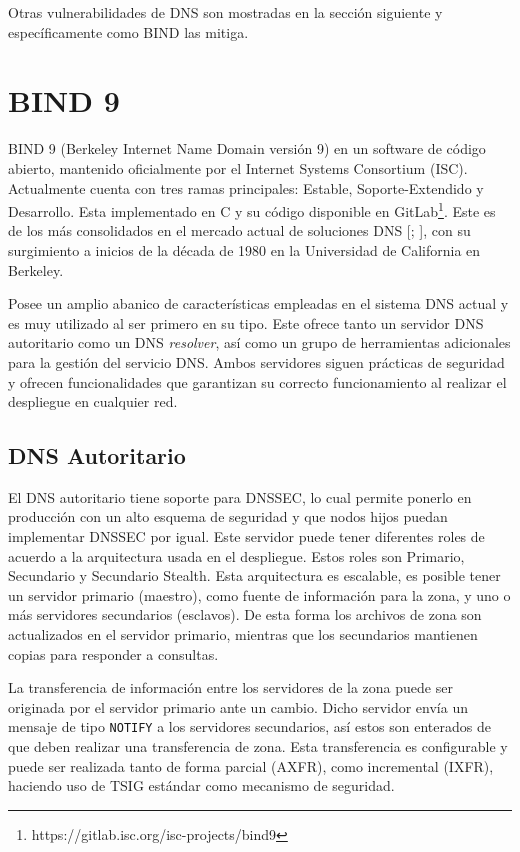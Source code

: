 Otras vulnerabilidades de DNS son mostradas en la sección siguiente y específicamente como BIND las mitiga.  

\section{BIND 9}

BIND 9 (Berkeley Internet Name Domain versión 9) en un software de código abierto, mantenido oficialmente por el Internet Systems Consortium (ISC). Actualmente cuenta con tres ramas principales: Estable, Soporte-Extendido y Desarrollo. Esta implementado en C y su código disponible en GitLab\footnote{https://gitlab.isc.org/isc-projects/bind9}. Este es de los más consolidados en el mercado actual de soluciones DNS [\cite{dns-survey}; \cite{bind-usage}], con su surgimiento a inicios de la década de 1980 en la Universidad de California en Berkeley.

Posee un amplio abanico de características empleadas en el sistema DNS actual y es muy utilizado al ser primero en su tipo. Este ofrece tanto un servidor DNS autoritario como un DNS \textit{resolver}, así como un grupo de herramientas adicionales para la gestión del servicio DNS. Ambos servidores siguen prácticas de seguridad y ofrecen funcionalidades que garantizan su correcto funcionamiento al realizar el despliegue en cualquier red.

\subsection{DNS Autoritario}

El DNS autoritario tiene soporte para DNSSEC, lo cual permite ponerlo en producción con un alto esquema de seguridad y que nodos hijos puedan implementar DNSSEC por igual. Este servidor puede tener diferentes roles de acuerdo a la arquitectura usada en el despliegue. Estos roles son Primario, Secundario y Secundario Stealth. Esta arquitectura es escalable, es posible tener un servidor primario (maestro), como fuente de información para la zona, y uno o más servidores secundarios (esclavos). De esta forma los archivos de zona son actualizados en el servidor primario, mientras que los secundarios mantienen copias para responder a consultas.

La transferencia de información entre los servidores de la zona puede ser originada por el servidor primario ante un cambio. Dicho servidor envía un mensaje de tipo \verb+NOTIFY+ a los servidores secundarios, así estos son enterados de que deben realizar una transferencia de zona. Esta transferencia es configurable y puede ser realizada tanto de forma parcial (AXFR), como incremental (IXFR), haciendo uso de TSIG estándar como mecanismo de seguridad.

